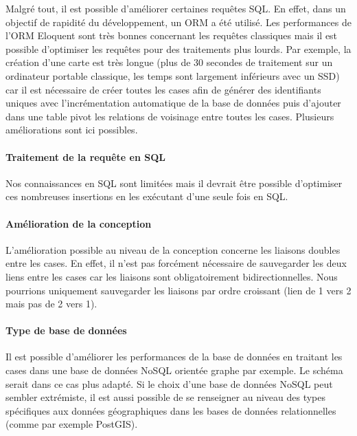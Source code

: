 		Malgré tout, il est possible d'améliorer certaines requêtes SQL. En effet, dans un objectif de rapidité du développement, un ORM a été utilisé. Les performances de l'ORM Eloquent sont très bonnes concernant les requêtes classiques mais il est possible d'optimiser les requêtes pour des traitements plus lourds. Par exemple, la création d'une carte est très longue (plus de 30 secondes de traitement sur un ordinateur portable classique, les temps sont largement inférieurs avec un SSD) car il est nécessaire de créer toutes les cases afin de générer des identifiants uniques avec l'incrémentation automatique de la base de données puis d'ajouter dans une table pivot les relations de voisinage entre toutes les cases. Plusieurs améliorations sont ici possibles.

		\paragraph{Traitement de la requête en SQL} %
		\label{par:traitement_de_la_requete_en_sql}
			
			Nos connaissances en SQL sont limitées mais il devrait être possible d'optimiser ces nombreuses insertions en les exécutant d'une seule fois en SQL.


		\paragraph{Amélioration de la conception} %
		\label{par:amelioration_de_la_conception}
		
			L'amélioration possible au niveau de la conception concerne les liaisons doubles entre les cases. En effet, il n'est pas forcément nécessaire de sauvegarder les deux liens entre les cases car les liaisons sont obligatoirement bidirectionnelles. Nous pourrions uniquement sauvegarder les liaisons par ordre croissant (lien de 1 vers 2 mais pas de 2 vers 1).


		\paragraph{Type de base de données} %
		\label{par:type_de_base_de_donnees}
		
			Il est possible d'améliorer les performances de la base de données en traitant les cases dans une base de données NoSQL orientée graphe par exemple. Le schéma serait dans ce cas plus adapté. Si le choix d'une base de données NoSQL peut sembler extrémiste, il est aussi possible de se renseigner au niveau des types spécifiques aux données géographiques dans les bases de données relationnelles (comme par exemple PostGIS).


